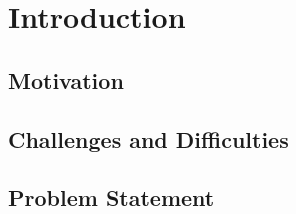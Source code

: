 
\chapter{Introduction}

\lipsum[1-5]
\section{Motivation}
\lipsum[6-10]

\section{Challenges and Difficulties}
\lipsum[11-15]

\section{Problem Statement}
\lipsum[21-30]
